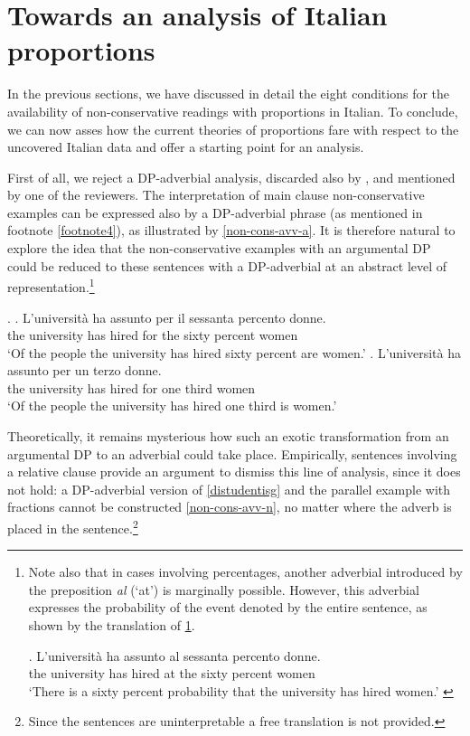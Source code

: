 \documentclass[charis, linguex]{glossa}
\begin{document}
\section{Towards an analysis of Italian proportions} \label{Sec-conclusions}

In the previous sections, we have discussed in detail the eight conditions for the availability of non-conservative readings with proportions in Italian. To conclude, we can now asses how the current theories of proportions fare with respect to the uncovered Italian data and offer a starting point for an analysis.

First of all, we reject a DP-adverbial analysis, discarded also by \citet{pas22}, and mentioned by one of the reviewers. 
The interpretation of main clause non-conservative examples can be expressed also by a DP-adverbial phrase (as mentioned in footnote \ref{footnote4}), as illustrated by \ref{non-cons-avv-a}. It is therefore natural to explore the idea that the non-conservative examples with an argumental DP could be reduced to these sentences with a DP-adverbial at an abstract level of representation.\footnote{Note also that in cases involving percentages, another adverbial introduced by the preposition \textit{al} (`at') is marginally possible. However, this adverbial
expresses the probability of the event denoted by the entire sentence, as shown by the translation of \ref{atsixty}.

	\exg. L'universit\`{a} ha assunto al sessanta percento donne. \\
     {the university} has hired {at the} sixty percent women  \\ 
  \glt `There is a sixty percent probability that the university has hired women.'  \label{atsixty}
  
  }

\ex. \label{non-cons-avv-a} \ag. L'universit\`{a} ha assunto per il sessanta percento donne. \\
     {the university} has hired for the sixty percent women  \\ 
  \glt `Of the people the university has hired sixty percent are women.' 
  \bg. L'universit\`{a} ha assunto per un terzo donne. \\
       {the university} has hired for one third women \\
    \glt `Of the people the university has hired one third is women.' 

Theoretically, it remains mysterious how such an exotic transformation from an argumental DP to an adverbial could take place. Empirically, sentences involving a relative clause provide an argument to dismiss this line of analysis, since it does not hold: a DP-adverbial version of \ref{distudentisg} and the parallel example with fractions cannot be constructed \ref{non-cons-avv-n}, no matter where the adverb is placed in the sentence.\footnote{Since the sentences are uninterpretable a free translation is not provided.}
\end{document}
